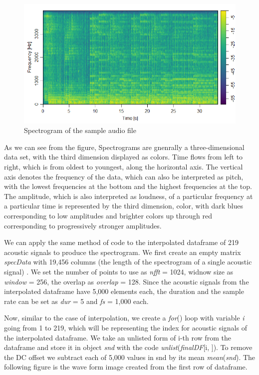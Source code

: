 \begin{figure}[H]
    \centering
    \includegraphics[width=12cm]{images/Spectrum/Spectrum (Processed).png}
    \caption{Spectrogram of the sample audio file}
    \label{fig:samplespectogram} 
\end{figure}

As we can see from the figure, Spectrograms are gnenrally a three-dimensional data set, with the third dimension displayed as colors. Time flows from left to right, which is from oldest to youngest, along the horizontal axis. The vertical axis denotes the frequency of the data, which can also be interpreted as pitch, with the lowest frequencies at the bottom and the highest frequencies at the top. The amplitude, which is also interpreted as loudness, of a particular frequency at a particular time is represented by the third dimension, color, with dark blues corresponding to low amplitudes and brighter colors up through red corresponding to progressively stronger amplitudes.

We can apply the same method of code to the interpolated dataframe of 219 acoustic signals to produce the spectrogram. We first create an empty matrix \emph{specData} with 19,456 columns (the length of the spectrogram of a single acoustic signal)  . We set the number of points to use as \emph{nfft} = 1024, widnow size as \emph{window} = 256, the overlap as \emph{overlap} = 128. Since the acoustic signals from the interpolated dataframe have 5,000 elements each, the duration and the sample rate can be set as \emph{dur} = 5 and \emph{fs} = 1,000 each.  

Now, similar to the case of interpolation, we create a \emph{for}() loop with variable \emph{i} going from 1 to 219, which will be representing the index for acoustic signals of the interpolated dataframe. We take an unlisted form of i-th row from the dataframe and store it in object \emph{snd} with the code \emph{unlist}(\emph{finalDF}[i, ]). To remove the DC offset we subtract each of 5,000 values in snd by its mean \emph{mean}(\emph{snd}). The following figure is the wave form image created from the first row of dataframe.

